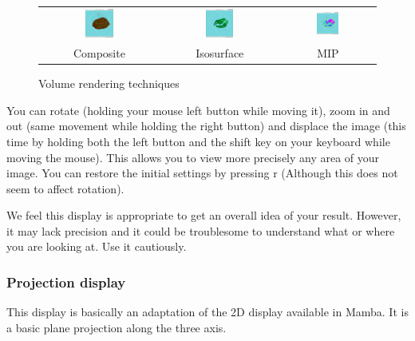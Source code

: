 \documentclass[a4paper,10pt,oneside]{article}
\begin{document}
\begin{figure}
\centering
\begin{tabular}{ccc}
\includegraphics[width=0.25\textwidth]{images/display_compo.png} & 
\includegraphics[width=0.25\textwidth]{images/display_isosurface.png} &
\includegraphics[width=0.25\textwidth]{images/display_mip.png} \\ 
Composite &
Isosurface &
MIP \\ 
\end{tabular}
\caption{Volume rendering techniques}
\label{fig:dis3D_method}
\end{figure}

You can rotate (holding your mouse left button while moving it), zoom in and
out (same movement while holding the right button) and displace the image
(this time by holding both the left button and the shift key on your keyboard
while moving the mouse). This allows you to view more precisely any area of
your image. You can restore the initial settings by pressing r (Although this
does not seem to affect rotation).

We feel this display is appropriate to get an overall idea of your
result. However, it may lack precision and it could be troublesome to
understand what or where you are looking at. Use it cautiously.

\subsubsection{Projection display}
This display is basically an adaptation of the 2D display available in Mamba.
It is a basic plane projection along the three axis.
\end{document}
